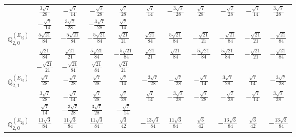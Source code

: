 \documentclass[fleqn,10pt,landscape]{article}
\begin{document}
\begin{itemize}
{\begin{center}
\begin{longtable}{ccccccccccc}
& $ \frac{3 \sqrt{7}}{28} $ & $ - \frac{\sqrt{7}}{14} $ & $ - \frac{\sqrt{7}}{28} $ & $ \frac{\sqrt{7}}{28} $ & $ \frac{\sqrt{7}}{14} $ & $ - \frac{3 \sqrt{7}}{28} $ & $ \frac{\sqrt{7}}{28} $ & $ - \frac{\sqrt{7}}{28} $ & $ - \frac{\sqrt{7}}{14} $ & $ \frac{3 \sqrt{7}}{28} $ \\
& $ - \frac{\sqrt{7}}{14} $ & $ \frac{3 \sqrt{7}}{28} $ & $ - \frac{3 \sqrt{7}}{28} $ & $ \frac{\sqrt{7}}{14} $ & $  $ & $  $ & $  $ & $  $ & $  $ & $  $ \\ \hline
$\mathbb{Q}_{2,0}^{(E_{1g})}$ & $ \frac{5 \sqrt{21}}{84} $ & $ - \frac{5 \sqrt{21}}{84} $ & $ - \frac{5 \sqrt{21}}{84} $ & $ \frac{\sqrt{21}}{21} $ & $ \frac{\sqrt{21}}{84} $ & $ \frac{5 \sqrt{21}}{84} $ & $ - \frac{\sqrt{21}}{21} $ & $ - \frac{\sqrt{21}}{84} $ & $ - \frac{\sqrt{21}}{21} $ & $ - \frac{\sqrt{21}}{84} $ \\
& $ \frac{\sqrt{21}}{84} $ & $ \frac{\sqrt{21}}{21} $ & $ \frac{5 \sqrt{21}}{84} $ & $ - \frac{5 \sqrt{21}}{84} $ & $ \frac{\sqrt{21}}{21} $ & $ \frac{\sqrt{21}}{84} $ & $ - \frac{5 \sqrt{21}}{84} $ & $ \frac{5 \sqrt{21}}{84} $ & $ - \frac{\sqrt{21}}{21} $ & $ - \frac{\sqrt{21}}{84} $ \\
& $ - \frac{\sqrt{21}}{21} $ & $ - \frac{\sqrt{21}}{84} $ & $ \frac{\sqrt{21}}{84} $ & $ \frac{\sqrt{21}}{21} $ & $  $ & $  $ & $  $ & $  $ & $  $ & $  $ \\ \hline
$\mathbb{Q}_{2,1}^{(E_{1g})}$ & $ \frac{\sqrt{7}}{28} $ & $ - \frac{\sqrt{7}}{28} $ & $ \frac{\sqrt{7}}{28} $ & $ \frac{\sqrt{7}}{14} $ & $ - \frac{3 \sqrt{7}}{28} $ & $ - \frac{\sqrt{7}}{28} $ & $ - \frac{\sqrt{7}}{14} $ & $ \frac{3 \sqrt{7}}{28} $ & $ \frac{\sqrt{7}}{14} $ & $ - \frac{3 \sqrt{7}}{28} $ \\
& $ \frac{3 \sqrt{7}}{28} $ & $ - \frac{\sqrt{7}}{14} $ & $ \frac{\sqrt{7}}{28} $ & $ \frac{\sqrt{7}}{28} $ & $ \frac{\sqrt{7}}{14} $ & $ - \frac{3 \sqrt{7}}{28} $ & $ - \frac{\sqrt{7}}{28} $ & $ - \frac{\sqrt{7}}{28} $ & $ - \frac{\sqrt{7}}{14} $ & $ \frac{3 \sqrt{7}}{28} $ \\
& $ \frac{\sqrt{7}}{14} $ & $ - \frac{3 \sqrt{7}}{28} $ & $ \frac{3 \sqrt{7}}{28} $ & $ - \frac{\sqrt{7}}{14} $ & $  $ & $  $ & $  $ & $  $ & $  $ & $  $ \\ \hline
$\mathbb{Q}_{2,0}^{(E_{2g})}$ & $ \frac{11 \sqrt{3}}{84} $ & $ \frac{11 \sqrt{3}}{84} $ & $ \frac{11 \sqrt{3}}{84} $ & $ \frac{\sqrt{3}}{42} $ & $ - \frac{13 \sqrt{3}}{84} $ & $ \frac{11 \sqrt{3}}{84} $ & $ \frac{\sqrt{3}}{42} $ & $ - \frac{13 \sqrt{3}}{84} $ & $ \frac{\sqrt{3}}{42} $ & $ - \frac{13 \sqrt{3}}{84} $ \\

\end{longtable}
\end{center}}
\end{itemize}
\end{document}
